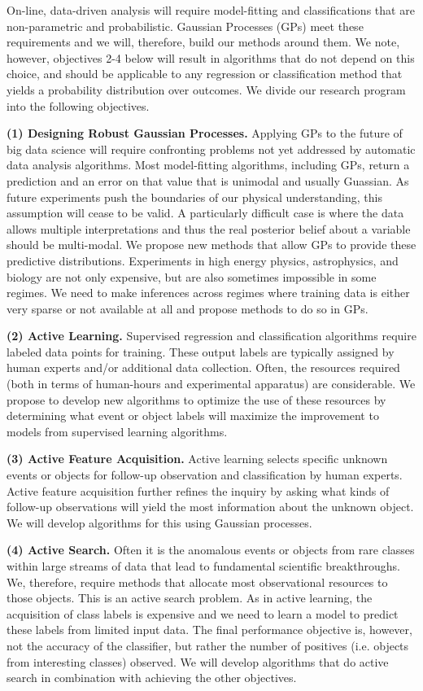 \documentclass[prd,nofootbib,floatfix,11pt,tightenlines]{revtex4}
\begin{document}
On-line, data-driven analysis will require model-fitting and
classifications that are non-parametric and probabilistic.  Gaussian
Processes (GPs) meet these requirements and we will, therefore, build our
methods around them.  We note, however, objectives 2-4 below will result in
algorithms that do not depend on this choice, and should be applicable to
any regression or classification method that yields a probability
distribution over outcomes.  We divide our research program into the
following objectives.

{\bf (1) Designing Robust Gaussian Processes.}  Applying GPs to the future
of big data science will require confronting problems not yet addressed by
automatic data analysis algorithms. Most model-fitting algorithms,
including GPs, return a prediction and an error on that value that is
unimodal and usually Guassian.  As future experiments push the boundaries
of our physical understanding, this assumption will cease to be valid.  A
particularly difficult case is where the data allows multiple
interpretations and thus the real posterior belief about a variable should
be multi-modal.  We propose new methods that allow GPs to provide these
predictive distributions.  Experiments in high energy physics,
astrophysics, and biology are not only expensive, but are also sometimes
impossible in some regimes.  We need to make inferences across regimes
where training data is either very sparse or not available at all and
propose methods to do so in GPs.

{\bf (2) Active Learning.} Supervised regression and classification
algorithms require labeled data points for training.  These output labels
are typically assigned by human experts and/or additional data
collection.  Often, the resources required (both in terms of human-hours
and experimental apparatus) are considerable.  We propose to develop new
algorithms to optimize the use of these resources by determining what event
or object labels will maximize the improvement to models from supervised
learning algorithms.

{\bf (3) Active Feature Acquisition.}  Active learning selects specific
unknown events or objects for follow-up observation and classification by
human experts.  Active feature acquisition further refines the inquiry by
asking what kinds of follow-up observations will yield the most information
about the unknown object.  We will develop algorithms for this using
Gaussian processes.

{\bf (4) Active Search.} Often it is the anomalous events or objects from
rare classes within large streams of data that lead to fundamental
scientific breakthroughs. We, therefore, require methods that allocate most
observational resources to those objects.  This is an active search
problem. As in active learning, the acquisition of class labels is
expensive and we need to learn a model to predict these labels from limited
input data. The final performance objective is, however, not the accuracy
of the classifier, but rather the number of positives (i.e. objects from
interesting classes) observed.  We will develop algorithms that do active
search in combination with achieving the other objectives.
\end{document}
